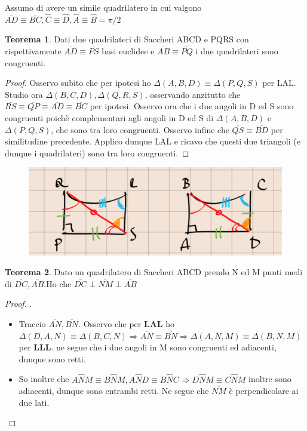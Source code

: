 \documentclass[a4paper,10pt]{article}
\theoremstyle{definition}
\theoremstyle{indentdefinition}
\theoremstyle{indentpostulate}
\theoremstyle{indenttheorem}
\newtheorem{thm}{Teorema}[section]
\theoremstyle{myremark}
\theoremstyle{indentgeneral}
\newenvironment{myboxed} 
{\noindent\begin{lrbox}{\mybox}\begin{minipage}{\textwidth}}
{\end{minipage}\end{lrbox}\fbox{\usebox{\mybox}}}
\begin{document}
Assumo di avere un simile quadrilatero in cui valgono $\overline{AD} \equiv \overline{BC}, \hat{C} \equiv \hat{D}, \hat{A} \equiv \hat{B} = \pi /2$

\begin{myboxed}
\begin{thm}  Dati due quadrilateri di Saccheri ABCD e PQRS con rispettivamente $\overline{AD} \equiv \overline{PS}$ basi euclidee e $\overline{AB} \equiv \overline{PQ}$ i due quadrilateri sono congruenti.    \end{thm} 
\end{myboxed}

\begin{proof}   Osservo subito che per ipotesi ho $\Delta (A,B,D) \equiv \Delta (P,Q,S)$ per LAL. Studio ora $\Delta (B,C,D),\Delta (Q,R,S)$, osservando anzitutto che $\overline{RS} \equiv \overline{QP} \equiv \overline{AD} \equiv \overline{BC}$ per ipotesi. Osservo ora che i due angoli in D ed S sono congruenti poichè complementari agli angoli in D ed S di $\Delta (A,B,D)$ e $\Delta (P,Q,S)$, che sono tra loro congruenti. Osservo infine che $\overline{QS} \equiv \overline{BD}$ per similitudine precedente. Applico dunque LAL e ricavo che questi due triangoli (e dunque i quadrilateri) sono tra loro congruenti.   \end{proof} 

\begin{figure}[H]
    \centering
    \includegraphics[scale=0.5]{Saccheri2.png}
\end{figure}

\begin{myboxed}
\begin{thm}    Dato un quadrilatero di Saccheri ABCD prendo N ed M punti medi di $\overline{DC},\overline{AB}$.Ho che $\overline{DC} \perp \overline{NM} \perp \overline{AB}$  \end{thm} 
\end{myboxed}

\begin{proof}  .
\begin{itemize}
    \item Traccio $\overline{AN}, \overline{BN}$. Osservo che per \textbf{LAL} ho $\Delta (D,A,N) \equiv \Delta (B,C,N) \Rightarrow \overline{AN} \equiv \overline{BN} \Rightarrow \Delta (A,N,M) \equiv \Delta (B,N,M)$ per \textbf{LLL}. ne segue che i due angoli in M sono congruenti ed adiacenti, dunque sono retti.
    \item So inoltre che $A\hat{N}M \equiv B \hat{N}M, A\hat{N}D \equiv B \hat{N}C \Rightarrow D \hat{N}M \equiv C \hat{N} M$ inoltre sono adiacenti, dunque sono entrambi retti. Ne segue che $\overline{NM}$ è perpendicolare ai due lati.
\end{itemize}   \end{proof} 
\end{document}
